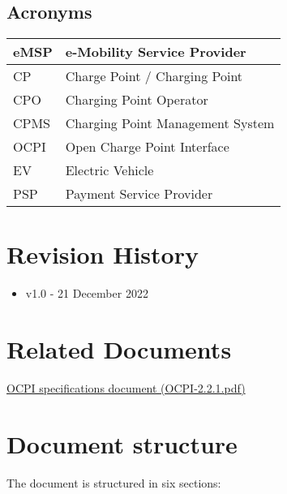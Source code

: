 \subsection{Acronyms}
\begin{tabular}{|l|l|}
	\hline
	eMSP & e-Mobility Service Provider\\
	\hline
	CP & Charge Point / Charging Point\\
	\hline
	CPO & Charging Point Operator\\
	\hline
	CPMS & Charging Point Management System\\
	\hline
	OCPI & Open Charge Point Interface\\
	\hline
	EV & Electric Vehicle\\
	\hline
	PSP & Payment Service Provider\\
	\hline
\end{tabular}

\section{Revision History}
\begin{itemize}
	\item v1.0 - 21 December 2022
\end{itemize}

\section{Related Documents}
\href{../Specs/OCPI-2.2.1.pdf}{OCPI specifications document (OCPI-2.2.1.pdf)}

\section{Document structure}
The document is structured in six sections:

